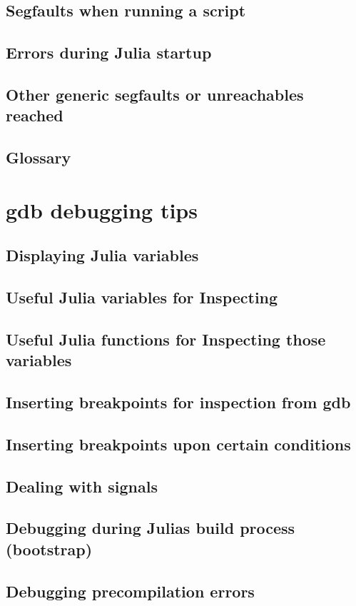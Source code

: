     \subsection{Segfaults when running a script}
    \subsection{Errors during Julia startup}
    \subsection{Other generic segfaults or unreachables reached}
    \subsection{Glossary}
    \section{gdb debugging tips}
    \subsection{Displaying Julia variables}
    \subsection{Useful Julia variables for Inspecting}
    \subsection{Useful Julia functions for Inspecting those variables}
    \subsection{Inserting breakpoints for inspection from gdb}
    \subsection{Inserting breakpoints upon certain conditions}
    \subsection{Dealing with signals}
    \subsection{Debugging during Julia{\textquotesingle}s build process (bootstrap)}
    \subsection{Debugging precompilation errors}
